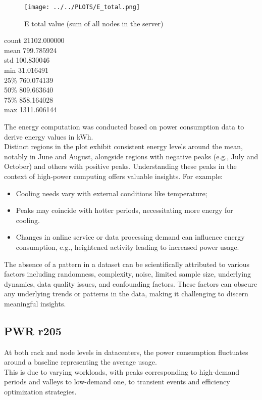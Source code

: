 \begin{figure}[H]
\centering
\texttt{[image: ../../PLOTS/E\_total.png]}
\captionsetup{skip=-10pt}
\caption{E total value (sum of all nodes in the server)}
\label{fig:E_total}
\end{figure}
\begin{center}
count    21102.000000 \\
mean       799.785924 \\
std        100.830046 \\
min         31.016491 \\
25\%        760.074139 \\
50\%        809.663640 \\
75\%        858.164028 \\
max       1311.606144
\end{center}
The energy computation was conducted based on power consumption data to derive energy values in kWh. \\
Distinct regions in the plot exhibit consistent energy levels around the mean, notably in June and August, alongside regions with negative peaks (e.g., July and October) and others with positive peaks. Understanding these peaks in the context of high-power computing offers valuable insights. For example:
\begin{itemize}
    \item Cooling needs vary with external conditions like temperature;
    \item Peaks may coincide with hotter periods, necessitating more energy for cooling.
    \item Changes in online service or data processing demand can influence energy consumption, e.g., heightened activity leading to increased power usage.
\end{itemize}
The absence of a pattern in a dataset can be scientifically attributed to various factors including randomness, complexity, noise, limited sample size, underlying dynamics, data quality issues, and confounding factors. These factors can obscure any underlying trends or patterns in the data, making it challenging to discern meaningful insights.




\subsection{PWR r205}
At both rack and node levels in datacenters, the power consumption fluctuates around a baseline representing the average usage.\\This is due to varying workloads, with peaks corresponding to high-demand periods and valleys to low-demand one, to transient events and efficiency optimization strategies.

